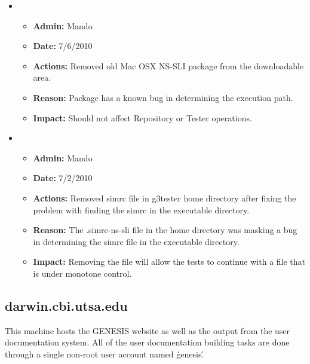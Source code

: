 \documentclass[12pt]{article}
\begin{document}
\begin{itemize}
\item 
\begin{itemize}
\item[] {\bf Admin:} Mando
\item[] {\bf Date:} 7/6/2010
\item[] {\bf Actions:} Removed old Mac OSX NS-SLI package from the downloadable area.
\item[] {\bf Reason:}   Package has a known bug in determining the execution path. 
\item[] {\bf Impact:} Should not affect Repository or Tester operations.
\end{itemize}

\item 
\begin{itemize}
\item[] {\bf Admin:} Mando
\item[] {\bf Date:} 7/2/2010 
\item[] {\bf Actions:} Removed simrc file in g3tester home directory after fixing the problem with finding the simrc in the executable directory.
\item[] {\bf Reason:} The .simrc-ns-sli file in the home directory was masking a bug in determining the simrc file in the executable directory. 
\item[] {\bf Impact:} Removing the file will allow the tests to continue with a file that is under monotone control.
\end{itemize}
\end{itemize}




\subsection*{darwin.cbi.utsa.edu}

This machine hosts the GENESIS website as well as the output from the user documentation system. All of the user documentation building tasks are done through a single non-root user account named \'genesis\'.
\end{document}
